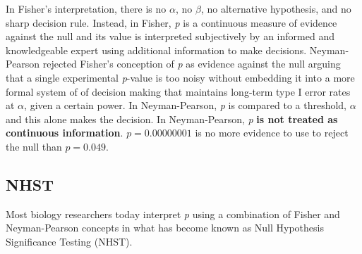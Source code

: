 \documentclass[]{book}
\begin{document}
In Fisher's interpretation, there is no \(\alpha\), no \(\beta\), no alternative hypothesis, and no sharp decision rule. Instead, in Fisher, \emph{p} is a continuous measure of evidence against the null and its value is interpreted subjectively by an informed and knowledgeable expert using additional information to make decisions. Neyman-Pearson rejected Fisher's conception of \emph{p} as evidence against the null arguing that a single experimental \emph{p}-value is too noisy without embedding it into a more formal system of of decision making that maintains long-term type I error rates at \(\alpha\), given a certain power. In Neyman-Pearson, \emph{p} is compared to a threshold, \(\alpha\) and this alone makes the decision. In Neyman-Pearson, \emph{p} \textbf{is not treated as continuous information}. \(p=0.00000001\) is no more evidence to use to reject the null than \(p=0.049\).

\hypertarget{nhst}{%
\subsection{NHST}\label{nhst}}

Most biology researchers today interpret \emph{p} using a combination of Fisher and Neyman-Pearson concepts in what has become known as Null Hypothesis Significance Testing (NHST).
\end{document}
